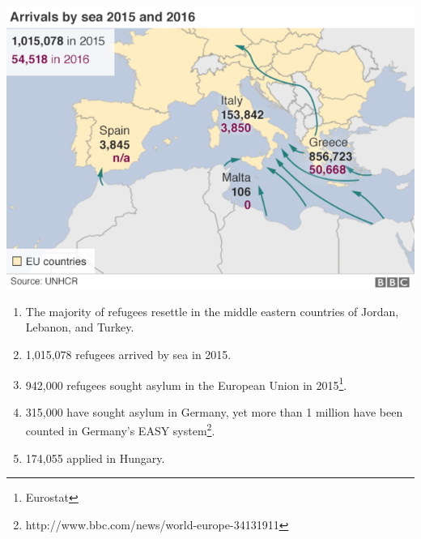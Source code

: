 \documentclass{article}
\begin{document}
\begin{center}
\includegraphics[scale=0.5]{travelmap}
\end{center}

\begin{enumerate}
    \item The majority of refugees resettle in the middle eastern countries of Jordan, Lebanon, and Turkey.
    \item 1,015,078 refugees arrived by sea in 2015.
    \item 942,000 refugees sought asylum in the European Union in 2015\footnote{Eurostat}.
    \item 315,000 have sought asylum in Germany, yet more than 1 million have been counted in Germany's EASY system\footnote{http://www.bbc.com/news/world-europe-34131911}.
    \item 174,055 applied in Hungary.
\end{enumerate}
\end{document}
